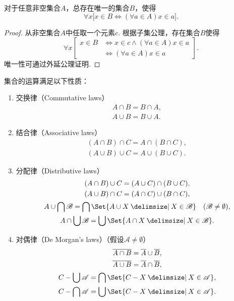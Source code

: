 \begin{theorem}
对于任意非空集合\(A\)，总存在唯一的集合\(B\)，使得\[
\forall x \bigl[
	x \in B \iff (\forall a \in A) x \in a
\bigr].
\]
\begin{proof}
从非空集合\(A\)中任取一个元素\(c\).
根据子集公理，存在集合\(B\)使得\[
\forall x \left[
	\begin{array}{rl}
	x \in B &\iff x \in c \land (\forall a \in A) x \in a \\
		&\iff (\forall a \in A) x \in a
	\end{array}
\right].
\]唯一性可通过外延公理证明.
\end{proof}
\end{theorem}

\begin{property}
集合的运算满足以下性质：
\begin{enumerate}
\item 交换律（{\rm Commutative laws}）
\begin{gather}
A \cap B = B \cap A, \label{equation:集合论.集合代数公式1} \\
A \cup B = B \cup A. \label{equation:集合论.集合代数公式2}
\end{gather}

\item 结合律（{\rm Associative laws}）
\begin{gather}
(A \cap B) \cap C = A \cap (B \cap C), \label{equation:集合论.集合代数公式3} \\
(A \cup B) \cup C = A \cup (B \cup C). \label{equation:集合论.集合代数公式4}
\end{gather}

\item 分配律（{\rm Distributive laws}）
\begin{gather}
(A \cap B) \cup C = (A \cup C) \cap (B \cup C), \label{equation:集合论.集合代数公式5} \\
(A \cup B) \cap C = (A \cap C) \cup (B \cap C), \label{equation:集合论.集合代数公式6} \\
A \cup \bigcap \mathscr{B} = \bigcap\Set{A \cup X \given X \in \mathscr{B}} \quad(\mathscr{B}\neq\emptyset), \label{equation:集合论.集合代数公式5'} \\
A \cap \bigcup \mathscr{B} = \bigcup\Set{A \cap X \given X \in \mathscr{B}}. \label{equation:集合论.集合代数公式6'}
\end{gather}

\item 对偶律（{\rm De Morgan's laws}）（假设\(\mathscr{A}\neq\emptyset\)）
\begin{gather}
\overline{A \cap B} = \overline A \cup \overline B, \label{equation:集合论.集合代数公式7} \\
\overline{A \cup B} = \overline A \cap \overline B, \label{equation:集合论.集合代数公式8} \\
C - \bigcup\mathscr{A} = \bigcap\Set{C-X \given X\in\mathscr{A}}, \label{equation:集合论.集合代数公式7'} \\
C - \bigcap\mathscr{A} = \bigcup\Set{C-X \given X\in\mathscr{A}}. \label{equation:集合论.集合代数公式8'}
\end{gather}


\end{enumerate}
\end{property}

